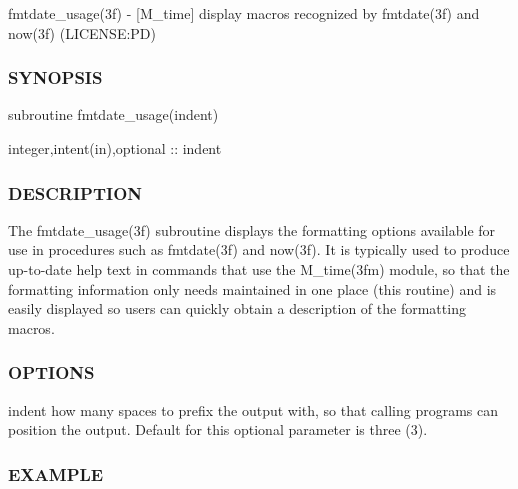 fmtdate\+\_\+usage(3f) -\/ \mbox{[}M\+\_\+time\mbox{]} display macros recognized by fmtdate(3f) and now(3f) (L\+I\+C\+E\+N\+SE\+:PD) 

\subsubsection*{S\+Y\+N\+O\+P\+S\+IS}

\begin{DoxyVerb}subroutine fmtdate_usage(indent)

 integer,intent(in),optional      :: indent
\end{DoxyVerb}


\subsubsection*{D\+E\+S\+C\+R\+I\+P\+T\+I\+ON}

The fmtdate\+\_\+usage(3f) subroutine displays the formatting options available for use in procedures such as fmtdate(3f) and now(3f). It is typically used to produce up-\/to-\/date help text in commands that use the M\+\_\+time(3fm) module, so that the formatting information only needs maintained in one place (this routine) and is easily displayed so users can quickly obtain a description of the formatting macros.

\subsubsection*{O\+P\+T\+I\+O\+NS}

indent how many spaces to prefix the output with, so that calling programs can position the output. Default for this optional parameter is three (3).

\subsubsection*{E\+X\+A\+M\+P\+LE}

